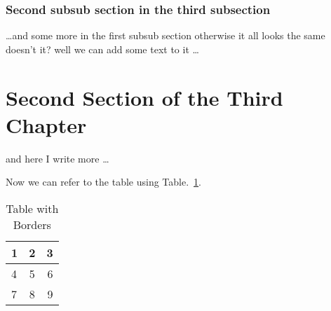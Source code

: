 \subsubsection{Second subsub section in the third subsection}
\dots and some more in the first subsub section otherwise it all looks the same
doesn't it? well we can add some text to it \dots

\section{Second Section of the Third Chapter}
and here I write more \dots

Now we can refer to the table using Table.~\ref{t:borders}.
\begin{table}[h]
\caption{Table with Borders}
\centering
\label{t:borders}
\begin{tabular}{|l|c| r|}

\hline
1 & 2 & 3 \\ \hline
4 & 5 & 6 \\ \hline
7 & 8 & 9 \\ \hline
\end{tabular}
\end{table}
